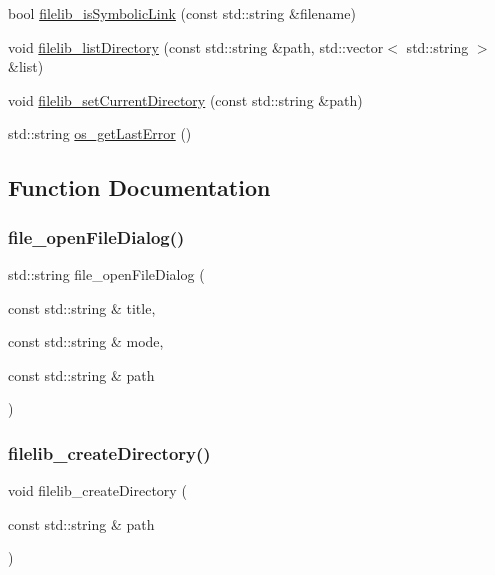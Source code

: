 \begin{DoxyCompactItemize}
bool \mbox{\hyperlink{namespaceplatform_a69dc63b6fb991650c05dde15b04ca465}{filelib\+\_\+is\+Symbolic\+Link}} (const std\+::string \&filename)
\item 
void \mbox{\hyperlink{namespaceplatform_acad9142fb05b5756d75b8f8a68b5558b}{filelib\+\_\+list\+Directory}} (const std\+::string \&path, std\+::vector$<$ std\+::string $>$ \&list)
\item 
void \mbox{\hyperlink{namespaceplatform_afe79a966d14e3b8d08939712884fa9d3}{filelib\+\_\+set\+Current\+Directory}} (const std\+::string \&path)
\item 
std\+::string \mbox{\hyperlink{namespaceplatform_a33caced893c9dd544cd80f354c5ec359}{os\+\_\+get\+Last\+Error}} ()
\end{DoxyCompactItemize}


\subsection{Function Documentation}
\mbox{\label{namespaceplatform_aa812fb80e0cb15f75d35975ea91e8f2b}} 
\subsubsection{\texorpdfstring{file\+\_\+open\+File\+Dialog()}{file\_openFileDialog()}}
{\footnotesize\ttfamily std\+::string file\+\_\+open\+File\+Dialog (\begin{DoxyParamCaption}\item[{const std\+::string \&}]{title,  }\item[{const std\+::string \&}]{mode,  }\item[{const std\+::string \&}]{path }\end{DoxyParamCaption})}

\mbox{\label{namespaceplatform_aa30655cd42c277a7c5ed7aba21cf0050}} 
\subsubsection{\texorpdfstring{filelib\+\_\+create\+Directory()}{filelib\_createDirectory()}}
{\footnotesize\ttfamily void filelib\+\_\+create\+Directory (\begin{DoxyParamCaption}\item[{const std\+::string \&}]{path }\end{DoxyParamCaption})}


